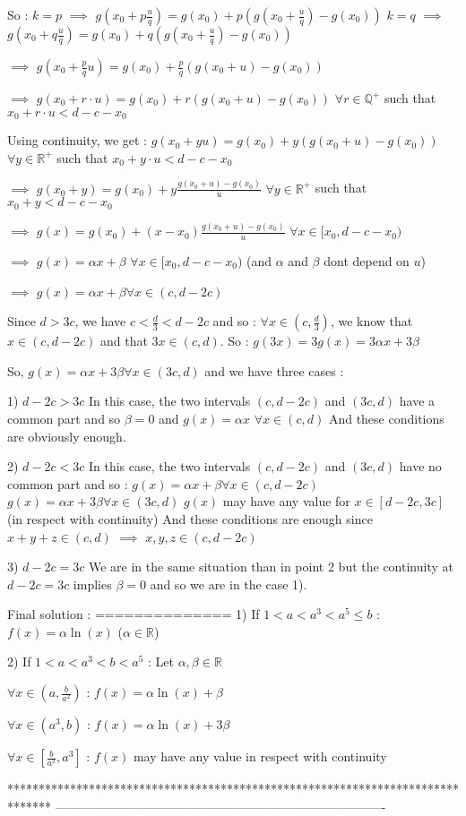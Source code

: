 \begin{solution}
So :
$ k=p$ $ \implies$ $ g(x_0+p\frac{u}{q})=g(x_0)+p(g(x_0+\frac{u}{q})-g(x_0))$
$ k=q$ $ \implies$ $ g(x_0+q\frac{u}{q})=g(x_0)+q(g(x_0+\frac{u}{q})-g(x_0))$

$ \implies$ $ g(x_0+\frac{p}{q}u)=g(x_0)+\frac{p}{q}(g(x_0+u)-g(x_0))$

$ \implies$ $ g(x_0+r\cdot u)=g(x_0)+r(g(x_0+u)-g(x_0))$ $ \forall r\in\mathbb Q^+$ such that $ x_0+r\cdot u<d-c-x_0$

Using continuity, we get : $ g(x_0+y u)=g(x_0)+y(g(x_0+u)-g(x_0))$ $ \forall y\in\mathbb R^+$ such that $ x_0+y\cdot u<d-c-x_0$

$ \implies$ $ g(x_0+y)=g(x_0)+y\frac{g(x_0+u)-g(x_0)}{u}$ $ \forall y\in\mathbb R^+$ such that $ x_0+y<d-c-x_0$

$ \implies$ $ g(x)=g(x_0)+(x-x_0)\frac{g(x_0+u)-g(x_0)}{u}$ $ \forall x\in [x_0,d-c-x_0)$

$ \implies$ $ g(x)=\alpha x + \beta$ $ \forall x\in [x_0,d-c-x_0)$ (and $ \alpha$ and $ \beta$ dont depend on $ u$)

$ \implies$ $ \boxed{g(x)=\alpha x + \beta \forall x\in (c,d-2c)}$

Since $ d>3c$, we have $ c<\frac{d}{3}<d-2c$ and so :
$ \forall x\in(c,\frac{d}{3})$, we know that ${ x\in (c,d-2c)}$ and that $ 3x\in(c,d)$. So : $ g(3x)=3g(x)=3\alpha x+3\beta$

So, $ \boxed{g(x)=\alpha x + 3\beta \forall x\in (3c,d)}$ and we have three cases :

1) $ d-2c > 3c$
In this case, the two intervals $ (c,d-2c)$ and $ (3c,d)$ have a common part and so $ \beta=0$ and $ g(x)=\alpha x$ $ \forall x\in (c,d)$
And these conditions are obviously enough.

2) $ d-2c < 3c$
In this case, the two intervals $ (c,d-2c)$ and $ (3c,d)$ have no common part and so :
$ g(x)=\alpha x + \beta \forall x\in (c,d-2c)$
$ g(x)=\alpha x + 3\beta \forall x\in (3c,d)$
$ g(x)$ may have any value for $ x\in[d-2c,3c]$ (in respect with continuity)
And these conditions are enough since $ x+y+z\in(c,d)$ $ \implies$ $ x,y,z\in(c,d-2c)$

3) $ d-2c=3c$
We are in the same situation than in point 2 but the continuity at $ d-2c=3c$ implies $ \beta=0$ and so we are in the case 1).

Final solution :
==============
1) If $ 1 < a < a^3 < a^5\leq b$ : $ f(x)=\alpha\ln(x)$ ($ \alpha\in\mathbb R$)

2) If $ 1 < a < a^3 < b < a^5$ : Let $ \alpha,\beta\in\mathbb R$

$ \forall x\in(a,\frac{b}{a^2})$ : $ f(x)=\alpha\ln(x)+\beta$

$ \forall x\in(a^3,b)$ : $ f(x)=\alpha\ln(x)+3\beta$

$ \forall x\in[\frac{b}{a^2},a^3]$ : $ f(x)$ may have any value in respect with continuity
\end{solution}
*******************************************************************************
-------------------------------------------------------------------------------

